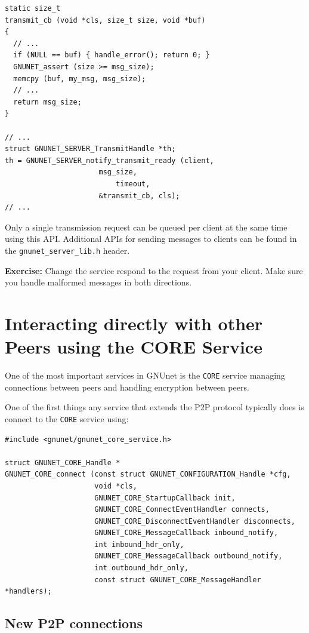 \documentclass[10pt]{article}
\newcommand{\exercise}[1]{\noindent\begin{boxedminipage}{\textwidth}{\bf Exercise:} #1 \end{boxedminipage}}
\begin{document}
\lstset{language=c}
\begin{lstlisting}
static size_t
transmit_cb (void *cls, size_t size, void *buf)
{
  // ...
  if (NULL == buf) { handle_error(); return 0; }
  GNUNET_assert (size >= msg_size);
  memcpy (buf, my_msg, msg_size);
  // ...
  return msg_size;
}

// ...
struct GNUNET_SERVER_TransmitHandle *th;
th = GNUNET_SERVER_notify_transmit_ready (client,
					  msg_size,
 				          timeout,
					  &transmit_cb, cls);
// ...
\end{lstlisting}

Only a single transmission request can be queued per client
at the same time using this API.
Additional APIs for sending messages to clients can be found
in the {\tt gnunet\_server\_lib.h} header.


\exercise{Change the service respond to the request from your
client.  Make sure you handle malformed messages in both directions.}


\section{Interacting directly with other Peers using the CORE Service}

One of the most important services in GNUnet is the \texttt{CORE} service
managing connections between peers and handling encryption between peers.

One of the first things any service that extends the P2P protocol typically does
is connect to the \texttt{CORE} service using:

\lstset{language=C}
\begin{lstlisting}
#include <gnunet/gnunet_core_service.h>

struct GNUNET_CORE_Handle *
GNUNET_CORE_connect (const struct GNUNET_CONFIGURATION_Handle *cfg,
                     void *cls,
                     GNUNET_CORE_StartupCallback init,
                     GNUNET_CORE_ConnectEventHandler connects,
                     GNUNET_CORE_DisconnectEventHandler disconnects,
                     GNUNET_CORE_MessageCallback inbound_notify,
                     int inbound_hdr_only,
                     GNUNET_CORE_MessageCallback outbound_notify,
                     int outbound_hdr_only,
                     const struct GNUNET_CORE_MessageHandler *handlers);
\end{lstlisting}

\subsection{New P2P connections}
\end{document}
